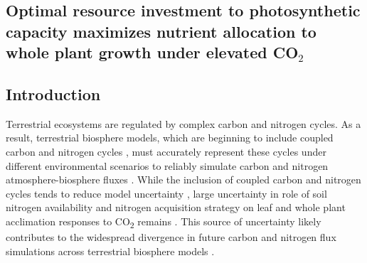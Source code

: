 \begin{singlespace}
    \chapter{\textbf{Optimal resource investment to photosynthetic capacity maximizes nutrient allocation to whole plant growth under elevated CO$_2$}}
\end{singlespace}
    
\section{Introduction}
Terrestrial ecosystems are regulated by complex carbon and nitrogen cycles. As a result, terrestrial biosphere models, which are beginning to include coupled carbon and nitrogen cycles , must accurately represent these cycles under different environmental scenarios to reliably simulate carbon and nitrogen atmosphere-biosphere fluxes . While the inclusion of coupled carbon and nitrogen cycles tends to reduce model uncertainty , large uncertainty in role of soil nitrogen availability and nitrogen acquisition strategy on leaf and whole plant acclimation responses to CO\textsubscript{2} remains . This source of uncertainty likely contributes to the widespread divergence in future carbon and nitrogen flux simulations across terrestrial biosphere models .

